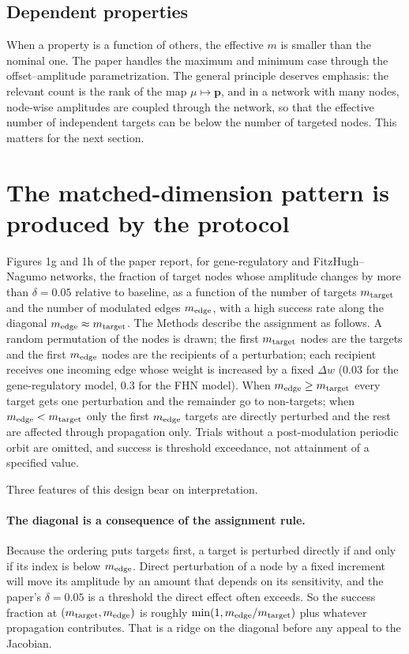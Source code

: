 \documentclass[11pt]{article}
\begin{document}
\subsection{Dependent properties}

When a property is a function of others, the effective $m$ is smaller than the nominal one. The paper handles the maximum and minimum case through the offset--amplitude parametrization. The general principle deserves emphasis: the relevant count is the rank of the map $\mu\mapsto\mathbf p$, and in a network with many nodes, node-wise amplitudes are coupled through the network, so that the effective number of independent targets can be below the number of targeted nodes. This matters for the next section.

\section{The matched-dimension pattern is produced by the protocol}

Figures 1g and 1h of the paper report, for gene-regulatory and FitzHugh--Nagumo networks, the fraction of target nodes whose amplitude changes by more than $\delta=0.05$ relative to baseline, as a function of the number of targets $m_{\rm target}$ and the number of modulated edges $m_{\rm edge}$, with a high success rate along the diagonal $m_{\rm edge}\approx m_{\rm target}$. The Methods describe the assignment as follows. A random permutation of the nodes is drawn; the first $m_{\rm target}$ nodes are the targets and the first $m_{\rm edge}$ nodes are the recipients of a perturbation; each recipient receives one incoming edge whose weight is increased by a fixed $\Delta w$ ($0.03$ for the gene-regulatory model, $0.3$ for the FHN model). When $m_{\rm edge}\ge m_{\rm target}$ every target gets one perturbation and the remainder go to non-targets; when $m_{\rm edge}<m_{\rm target}$ only the first $m_{\rm edge}$ targets are directly perturbed and the rest are affected through propagation only. Trials without a post-modulation periodic orbit are omitted, and success is threshold exceedance, not attainment of a specified value.

Three features of this design bear on interpretation.

\paragraph{The diagonal is a consequence of the assignment rule.} Because the ordering puts targets first, a target is perturbed directly if and only if its index is below $m_{\rm edge}$. Direct perturbation of a node by a fixed increment will move its amplitude by an amount that depends on its sensitivity, and the paper's $\delta=0.05$ is a threshold the direct effect often exceeds. So the success fraction at $(m_{\rm target},m_{\rm edge})$ is roughly $\min(1,m_{\rm edge}/m_{\rm target})$ plus whatever propagation contributes. That is a ridge on the diagonal before any appeal to the Jacobian.
\end{document}
